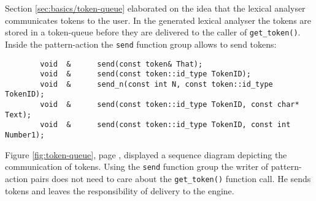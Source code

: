 Section \ref{sec:basics/token-queue} elaborated on the idea that the lexical
analyser communicates tokens to the user. In the {\quex} generated lexical
analyser the tokens are stored in a token-queue before they are delivered to
the caller of {\tt get\_token()}. Inside the pattern-action the {\tt send}
function group allows to send tokens:

\begin{lstlisting}
        void  &      send(const token& That);                             
        void  &      send(const token::id_type TokenID);                 
        void  &      send_n(const int N, const token::id_type TokenID);   
        void  &      send(const token::id_type TokenID, const char* Text);
        void  &      send(const token::id_type TokenID, const int Number1);
\end{lstlisting}

Figure \ref{fig:token-queue}, page \pageref{fig:token-queue}, displayed a sequence diagram depicting the
communication of tokens. Using the {\tt send} function group the writer of
pattern-action pairs does not need to care about the {\tt get\_token()}
function call. He sends tokens and leaves the responsibility of delivery
to the engine.

